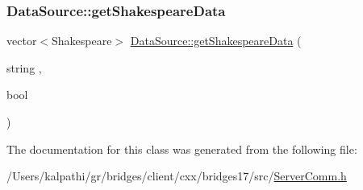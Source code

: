 \mbox{\label{classbridges_1_1_server_comm_a1f240eea3d39812606c0b3d10bdc757c}} 
\subsubsection{\texorpdfstring{Data\+Source\+::get\+Shakespeare\+Data}{DataSource::getShakespeareData}}
{\footnotesize\ttfamily vector$<$Shakespeare$>$ \mbox{\hyperlink{namespacebridges_1_1_data_source_abdf2e4d709e9b7f1a5370726676d86ec}{Data\+Source\+::get\+Shakespeare\+Data}} (\begin{DoxyParamCaption}\item[{string}]{,  }\item[{bool}]{ }\end{DoxyParamCaption})\hspace{0.3cm}{\ttfamily [friend]}}



The documentation for this class was generated from the following file\+:\begin{DoxyCompactItemize}
\item 
/\+Users/kalpathi/gr/bridges/client/cxx/bridges17/src/\mbox{\hyperlink{_server_comm_8h}{Server\+Comm.\+h}}\end{DoxyCompactItemize}
